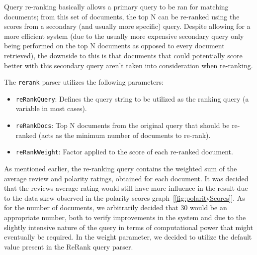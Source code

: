 \documentclass[sigconf]{acmart}
\begin{document}
Query re-ranking basically allows a primary query to be ran for matching documents; from this set of documents, the top N can be re-ranked using the scores from a secondary (and usually more specific) query. Despite allowing for a more efficient system (due to the usually more expensive secondary query only being performed on the top N documents as opposed to every document retrieved), the downside to this is that documents that could potentially score better with this secondary query aren't taken into consideration when re-ranking.

The \texttt{rerank} parser utilizes the following parameters:

\begin{itemize}
    \item \texttt{reRankQuery}: Defines the query string to be utilized as the ranking query (a variable in most cases).
    \item \texttt{reRankDocs}: Top N documents from the original query that should be re-ranked (acts as the minimum number of documents to re-rank).
    \item \texttt{reRankWeight}: Factor applied to the score of each re-ranked document.
\end{itemize}

As mentioned earlier, the re-ranking query contains the weighted sum of the average review and polarity ratings, obtained for each document. It was decided that the reviews average rating would still have more influence in the result due to the data skew observed in the polarity scores graph~[\ref{fig:polarityScores}]. As for the number of documents, we arbitrarily decided that 30 would be an appropriate number, both to verify improvements in the system and due to the slightly intensive nature of the query in terms of computational power that might eventually be required. In the weight parameter, we decided to utilize the default value present in the ReRank query parser.

\begin{table}[H]
    \caption{ReRank Query Parser Fields}
    \label{tab:rerank_parser}
\end{table}
\end{document}
